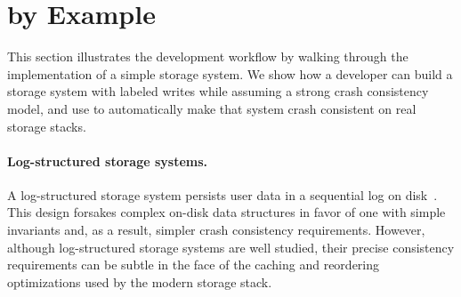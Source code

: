 \section{\depsynth by Example}
\label{depsynth:s:overview}

This section illustrates the \depsynth development workflow
by walking through the implementation of a simple storage system.
We show how a developer can build a storage system with labeled writes
while assuming a strong crash consistency model,
and use \depsynth to automatically make that system crash consistent on real storage stacks.

\paragraph{Log-structured storage systems.}
A log-structured storage system
persists user data in a sequential log on disk~\cite{rosenblum:lfs}.
This design forsakes complex on-disk data structures
in favor of one with simple invariants and, as a result, simpler crash consistency requirements.
However, although log-structured storage systems are well studied,
their precise consistency requirements can be subtle
in the face of the caching and reordering optimizations used by the modern storage stack.

